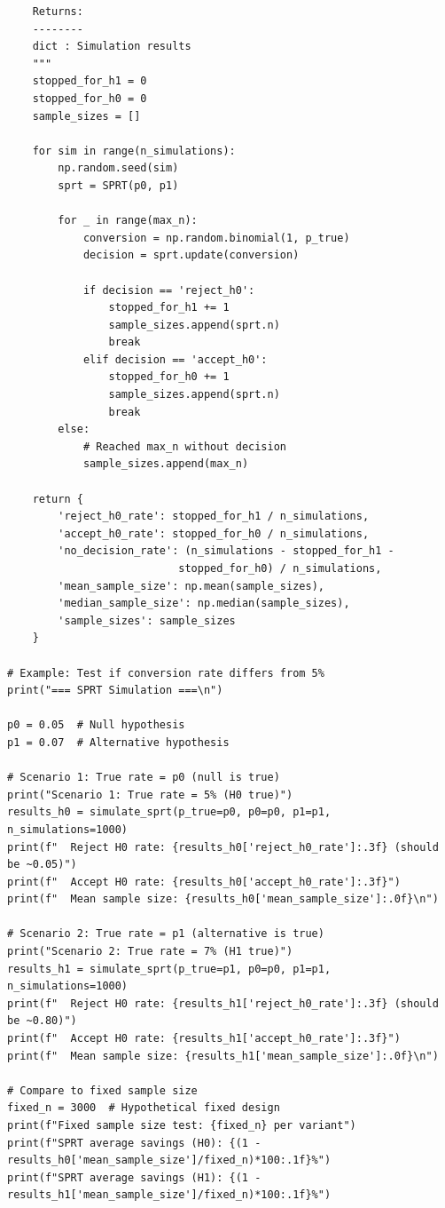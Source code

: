 \begin{lstlisting}
    Returns:
    --------
    dict : Simulation results
    """
    stopped_for_h1 = 0
    stopped_for_h0 = 0
    sample_sizes = []

    for sim in range(n_simulations):
        np.random.seed(sim)
        sprt = SPRT(p0, p1)

        for _ in range(max_n):
            conversion = np.random.binomial(1, p_true)
            decision = sprt.update(conversion)

            if decision == 'reject_h0':
                stopped_for_h1 += 1
                sample_sizes.append(sprt.n)
                break
            elif decision == 'accept_h0':
                stopped_for_h0 += 1
                sample_sizes.append(sprt.n)
                break
        else:
            # Reached max_n without decision
            sample_sizes.append(max_n)

    return {
        'reject_h0_rate': stopped_for_h1 / n_simulations,
        'accept_h0_rate': stopped_for_h0 / n_simulations,
        'no_decision_rate': (n_simulations - stopped_for_h1 -
                           stopped_for_h0) / n_simulations,
        'mean_sample_size': np.mean(sample_sizes),
        'median_sample_size': np.median(sample_sizes),
        'sample_sizes': sample_sizes
    }

# Example: Test if conversion rate differs from 5%
print("=== SPRT Simulation ===\n")

p0 = 0.05  # Null hypothesis
p1 = 0.07  # Alternative hypothesis

# Scenario 1: True rate = p0 (null is true)
print("Scenario 1: True rate = 5% (H0 true)")
results_h0 = simulate_sprt(p_true=p0, p0=p0, p1=p1, n_simulations=1000)
print(f"  Reject H0 rate: {results_h0['reject_h0_rate']:.3f} (should be ~0.05)")
print(f"  Accept H0 rate: {results_h0['accept_h0_rate']:.3f}")
print(f"  Mean sample size: {results_h0['mean_sample_size']:.0f}\n")

# Scenario 2: True rate = p1 (alternative is true)
print("Scenario 2: True rate = 7% (H1 true)")
results_h1 = simulate_sprt(p_true=p1, p0=p0, p1=p1, n_simulations=1000)
print(f"  Reject H0 rate: {results_h1['reject_h0_rate']:.3f} (should be ~0.80)")
print(f"  Accept H0 rate: {results_h1['accept_h0_rate']:.3f}")
print(f"  Mean sample size: {results_h1['mean_sample_size']:.0f}\n")

# Compare to fixed sample size
fixed_n = 3000  # Hypothetical fixed design
print(f"Fixed sample size test: {fixed_n} per variant")
print(f"SPRT average savings (H0): {(1 - results_h0['mean_sample_size']/fixed_n)*100:.1f}%")
print(f"SPRT average savings (H1): {(1 - results_h1['mean_sample_size']/fixed_n)*100:.1f}%")


\end{lstlisting}
